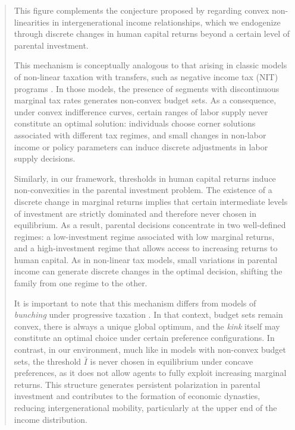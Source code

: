 \documentclass[12pt]{article}
\begin{document}
\begin{abstract}
This figure complements the conjecture proposed by \textcite{Bratsberg_2007} regarding convex non-linearities in intergenerational income relationships, which we endogenize through discrete changes in human capital returns beyond a certain level of parental investment.

This mechanism is conceptually analogous to that arising in classic models of non-linear taxation with transfers, such as negative income tax (NIT) programs \parencite{Burtless_1978,Hausman_1985}. In those models, the presence of segments with discontinuous marginal tax rates generates non-convex budget sets. As a consequence, under convex indifference curves, certain ranges of labor supply never constitute an optimal solution: individuals choose corner solutions associated with different tax regimes, and small changes in non-labor income or policy parameters can induce discrete adjustments in labor supply decisions.

Similarly, in our framework, thresholds in human capital returns induce non-convexities in the parental investment problem. The existence of a discrete change in marginal returns implies that certain intermediate levels of investment are strictly dominated and therefore never chosen in equilibrium. As a result, parental decisions concentrate in two well-defined regimes: a low-investment regime associated with low marginal returns, and a high-investment regime that allows access to increasing returns to human capital. As in non-linear tax models, small variations in parental income can generate discrete changes in the optimal decision, shifting the family from one regime to the other.

It is important to note that this mechanism differs from models of \emph{bunching} under progressive taxation \parencite{Saez_2010}. In that context, budget sets remain convex, there is always a unique global optimum, and the \emph{kink} itself may constitute an optimal choice under certain preference configurations. In contrast, in our environment, much like in models with non-convex budget sets, the threshold $\bar I$ is never chosen in equilibrium under concave preferences, as it does not allow agents to fully exploit increasing marginal returns. This structure generates persistent polarization in parental investment and contributes to the formation of economic dynasties, reducing intergenerational mobility, particularly at the upper end of the income distribution.


\begin{figure}[ht]
\centering
\label{fig:kink}
\end{figure}
\end{abstract}
\end{document}
